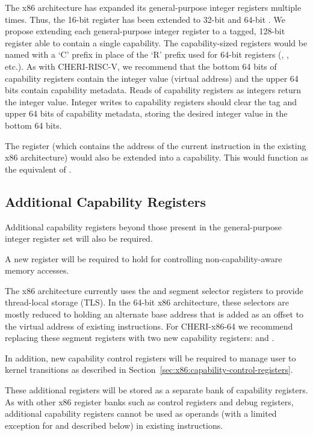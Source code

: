 The x86 architecture has expanded its general-purpose integer registers multiple
times.  Thus, the 16-bit \AX{} register has been extended to 32-bit \EAX{}
and 64-bit \RAX{}.
We propose extending each general-purpose integer register to a tagged, 128-bit register
able to contain a single capability.
The capability-sized registers would be named with a `C' prefix in place
of the `R' prefix used for 64-bit registers
(\CAX{}, \CBX{}, etc.).
As with CHERI-RISC-V,
we recommend that the bottom 64 bits of capability registers contain
the integer value (virtual address) and the upper 64 bits contain
capability metadata.
Reads of capability registers as integers return the integer value.
Integer writes to capability registers
should clear the tag and upper 64 bits of capability metadata, storing the
desired integer value in the bottom 64 bits.

The \RIP{} register (which contains the address of the current
instruction in the existing x86 architecture)
would also be extended into a \CIP{} capability.  This would function as
the equivalent of \PCC{}.

\subsection{Additional Capability Registers}
\label{sec:x86:additional-caps}

Additional capability registers beyond those present in the general-purpose
integer
register set will also be required.

A new register will be required to hold \DDC{} for controlling
non-capability-aware memory accesses.

The x86 architecture currently uses the \FS{} and \GS{} segment selector registers
to provide thread-local storage (TLS).  In the 64-bit x86 architecture,
these selectors are mostly reduced to holding an alternate base address
that is added as an offset to the virtual address of existing instructions.
For CHERI-x86-64 we recommend replacing these segment registers with two
new capability registers: \CFS{} and \CGS{}.

In addition, new capability control registers will be required to
manage user to kernel transitions as described in
Section~\ref{sec:x86:capability-control-registers}.

These additional registers will be stored as a separate bank of
capability registers.  As with other x86 register banks such as
control registers and debug registers, additional capability registers
cannot be used
as operands (with a limited exception for \CFS{} and \CGS{} described
below) in existing instructions.

